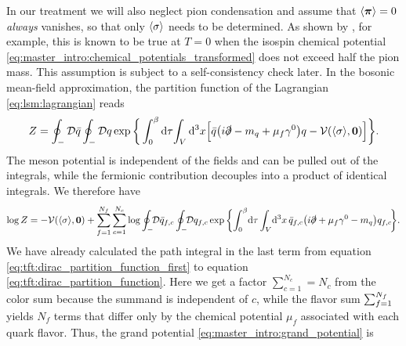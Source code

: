 In our treatment we will also neglect pion condensation and assume that $\langle {\bm{\pi}} \rangle=0$ \emph{always} vanishes,
so that only $\langle \sigma \rangle$ needs to be determined.
As shown by \cite{ref:jo_lsm_pion_condensation,ref:jo_lsm_consistent}, for example,
this is known to be true at $T=0$ when the isospin chemical potential \eqref{eq:master_intro:chemical_potentials_transformed} does not exceed half the pion mass.
This assumption is subject to a self-consistency check later.
In the bosonic mean-field approximation, the partition function of the Lagrangian \eqref{eq:lsm:lagrangian} reads
\begin{equation}
	Z = \oint_- \mathcal{D} \bar{q} \oint_- \mathcal{D} q \exp \bigg\{ \int_0^{\beta} \mathop{}\!\mathrm{d} \tau \! \int_V \mathop{}\!\mathrm{d}^3 x \Big[ \bar{q} \big( i \slashed\partial - m_q + \mu_f \gamma^0 \big) q - \mathcal{V}(\langle \sigma \rangle,{\bm{0}}) \Big] \bigg\}.
\end{equation}
The meson potential is independent of the fields and can be pulled out of the integrals,
while the fermionic contribution decouples into a product of identical integrals.
We therefore have
\begin{equation}
\begin{split}
	\log Z = -\pot(\avg{\sigma},\vec{0}) + \sum_{f=1}^{\smash{N_f}} \sum_{c=1}^{N_c} \log \oint_- \!\! \pathintdif \bar{q}_{f,c} \oint_- \!\! \pathintdif q_{f,c} \exp \bigg\{ \! \int_0^\beta \! \dif \tau \int_V \! \dif^3 x \, \bar{q}_{f,c} \big(i \slashed\partial + \mu_f \gamma^0 - m_q\big) q_{f,c} \! \bigg\} .
\end{split}
\end{equation}
We have already calculated the path integral in the last term
from equation \eqref{eq:tft:dirac_partition_function_first} to equation \eqref{eq:tft:dirac_partition_function}.
Here we get a factor $\sum_{c=1}^{N_c} = N_c$ from the color sum because the summand is independent of $c$,
while the flavor sum $\sum_{f=1}^{\smash{N_f}}$ yields $N_f$ terms that differ only by the chemical potential $\mu_f$ associated with each quark flavor. 
Thus, the grand potential \eqref{eq:master_intro:grand_potential} is
